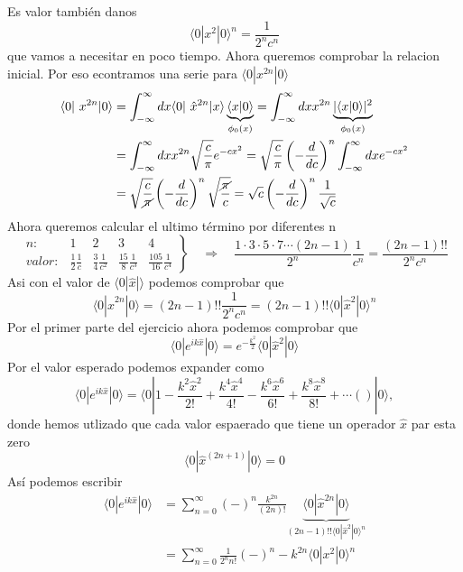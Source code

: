 Es valor también danos 
$$
	\langle 0 | x^2 | 0 \rangle^n = \frac{1}{2^n c^n}
$$
que vamos a necesitar en poco tiempo. Ahora queremos comprobar la relacion
inicial. Por eso econtramos una serie para $\langle 0 | x^{2n} | 0 \rangle$  
\begin{align*}
	\langle 0 | x^{2n} | 0\rangle &= \int_{-\infty}^\infty dx \langle 0 | \hat
x^{2n} | x \rangle \underbrace{\langle x | 0 \rangle}_{\phi_0(x)} =
\int_{-\infty}^\infty dx x^{2n} \underbrace{ | \langle x | 0\rangle
|^2 }_{\phi_0(x)} \\
	&= \int_{-\infty}^\infty dx x^{2n} \sqrt{\frac{c}{\pi}} e^{-c x^2} =
\sqrt{\frac{c}{\pi}} \left(-\frac{d}{dc}\right)^n \int_{-\infty}^\infty  dx
e^{-cx^2} \\ 
	 &= \sqrt{\frac{c}{\cancel{\pi}}} \left(- \frac{d}{dc} \right)^n
\sqrt{\frac{\cancel{\pi}}{c}} = \sqrt c \left(- \frac{d}{dc}\right)^n \frac{1}{\sqrt
c}
\end{align*}
Ahora queremos calcular el ultimo término por diferentes n
$$
	\left.
	\begin{array}{l|c|c|c|c}		
		n: & 1 & 2 & 3 & 4 \\
		\hline
		valor: & \frac{1}{2}\frac{1}{c} & \frac{3}{4} \frac{1}{c^2} &
\frac{15}{8} \frac{1}{c^3} & \frac{105}{16} \frac{1}{c^4}
	\end{array} \right\} \quad \Rightarrow \quad \frac{1\cdot3\cdot5\cdot7
\cdots (2n-1)}{2^n} \frac{1}{c^{n}} = \frac{(2n-1)!!}{2^n c^n}
$$
Asi con el valor de $\langle 0| \hat x | \rangle$ podemos comprobar que
$$
	\langle 0 | \hat  x^{2n} | 0 \rangle = (2n -1)!! \frac{1}{2^n c^n} = (2n-1)!!
\langle 0 | \hat x^2 | 0 \rangle^n 
$$
Por el primer parte del ejercicio ahora podemos comprobar que
$$
	\langle 0 | e^{ik\hat x} | 0 \rangle = e^{-\frac{k^2}{2}} \langle 0 | \hat
x^2 | 0 \rangle 
$$
Por el valor esperado podemos expander como
$$
	\langle 0 | e^{ik \hat x} | 0\rangle = \langle 0 | 1 - \frac{k^2 \hat
x^2}{2!} + \frac{k^4 \hat x^4}{4!} - \frac{k^6\hat x^6}{6!} + \frac{k^8\hat
x^8}{8!} + \cdots \left( \right) | 0 \rangle, 
$$
donde hemos utlizado que cada valor espaerado que tiene un operador $\hat x$ par esta zero 
$$
	\langle 0 | \hat x^(2n+1) | 0 \rangle = 0
$$
Así podemos escribir
\begin{align*}
	\langle 0 | e^{ik\hat x} | 0 \rangle &= \sum_{n=0}^\infty (-)^n
\frac{k^{2n}}{(2n)!} \underbrace{\langle 0 | \hat x^{2n} | 0
\rangle}_{(2n-1)!!\langle 0 | \hat x^2 | 0 \rangle^n} \\
	&= \sum_{n=0}^\infty \frac{1}{2^n n!} (-)^n -k^{2n} \langle 0 | x^2 | 0
\rangle^n
\end{align*}

